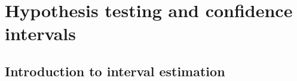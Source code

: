 

\section{Hypothesis testing and confidence intervals}

\subsection{Introduction to interval estimation}

